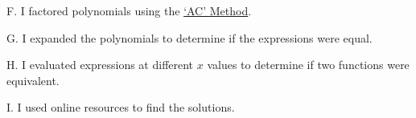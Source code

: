 \documentclass{ximera}
\begin{document}
\begin{question}
\begin{question}
    \begin{multipleChoice}
    \end{multipleChoice}
    
\end{question}

\begin{question}    
    
    F. I factored polynomials using the \href{https://people.richland.edu/james/misc/acmeth.html}{`AC' Method}.

    \begin{multipleChoice}
    \end{multipleChoice}
    
\end{question}

\begin{question}    
    
    G. I expanded the polynomials to determine if the expressions were equal.

    \begin{multipleChoice}
    \end{multipleChoice}
    
\end{question}

\begin{question}    
    
    H. I evaluated expressions at different $x$ values to determine if two functions were equivalent.

    \begin{multipleChoice}
    \end{multipleChoice}
    
\end{question}
      
\begin{question}    
    
    I. I used online resources to find the solutions.

    \begin{multipleChoice}
    \end{multipleChoice}
    
\end{question}
\begin{question}    
    

\end{question}
\end{question}
\end{document}
